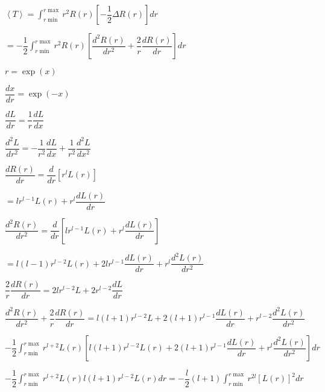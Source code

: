 \documentclass{jarticle}%
\begin{document}
$\left\langle T\right\rangle =%
{\displaystyle\int\nolimits_{r\min}^{r\max}}
r^{2}R\left(  r\right)  \left[  -\dfrac{1}{2}\Delta R\left(  r\right)
\right]  dr$

$=-\dfrac{1}{2}%
{\displaystyle\int\nolimits_{r\min}^{r\max}}
r^{2}R\left(  r\right)  \left[  \dfrac{d^{2}R\left(  r\right)  }{dr^{2}%
}+\dfrac{2}{r}\dfrac{dR\left(  r\right)  }{dr}\right]  dr$

$r=\exp\left(  x\right)  $

$\dfrac{dx}{dr}=\exp\left(  -x\right)  $

$\dfrac{dL}{dr}=\dfrac{1}{r}\dfrac{dL}{dx}$

$\dfrac{d^{2}L}{dr^{2}}=-\dfrac{1}{r^{2}}\dfrac{dL}{dx}+\dfrac{1}{r^{2}}%
\dfrac{d^{2}L}{dx^{2}}$

$\dfrac{dR\left(  r\right)  }{dr}=\dfrac{d}{dr}\left[  r^{l}L\left(  r\right)
\right]  $

$=lr^{l-1}L\left(  r\right)  +r^{l}\dfrac{dL\left(  r\right)  }{dr}$

$\dfrac{d^{2}R\left(  r\right)  }{dr^{2}}=\dfrac{d}{dr}\left[  lr^{l-1}%
L\left(  r\right)  +r^{l}\dfrac{dL\left(  r\right)  }{dr}\right]  $

$=l\left(  l-1\right)  r^{l-2}L\left(  r\right)  +2lr^{l-1}\dfrac{dL\left(
r\right)  }{dr}+r^{l}\dfrac{d^{2}L\left(  r\right)  }{dr^{2}}$

$\dfrac{2}{r}\dfrac{dR\left(  r\right)  }{dr}=2lr^{l-2}L+2r^{l-2}\dfrac
{dL}{dr}$

$\dfrac{d^{2}R\left(  r\right)  }{dr^{2}}+\dfrac{2}{r}\dfrac{dR\left(
r\right)  }{dr}=l\left(  l+1\right)  r^{l-2}L+2\left(  l+1\right)
r^{l-1}\dfrac{dL\left(  r\right)  }{dr}+r^{l-2}\dfrac{d^{2}L\left(  r\right)
}{dr^{2}}$

$-\dfrac{1}{2}%
{\displaystyle\int\nolimits_{r\min}^{r\max}}
r^{l+2}L\left(  r\right)  \left[  l\left(  l+1\right)  r^{l-2}L\left(
r\right)  +2\left(  l+1\right)  r^{l-1}\dfrac{dL\left(  r\right)  }{dr}%
+r^{l}\dfrac{d^{2}L\left(  r\right)  }{dr^{2}}\right]  dr$

$-\dfrac{1}{2}%
{\displaystyle\int\nolimits_{r\min}^{r\max}}
r^{l+2}L\left(  r\right)  l\left(  l+1\right)  r^{l-2}L\left(  r\right)
dr=-\dfrac{l}{2}\left(  l+1\right)
{\displaystyle\int\nolimits_{r\min}^{r\max}}
r^{2l}\left[  L\left(  r\right)  \right]  ^{2}dr$
\end{document}
